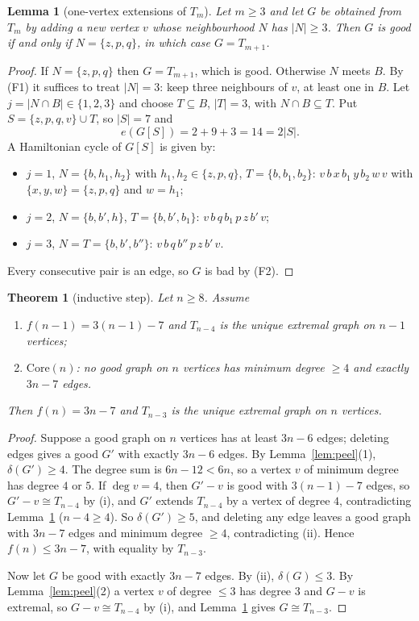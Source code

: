 \documentclass[11pt]{amsart}
\newtheorem{theorem}{Theorem}
\newtheorem{lemma}{Lemma}
\theoremstyle{remark}
\newcommand{\Tm}[1]{T_{#1}}
\begin{document}
\begin{lemma}[one-vertex extensions of $\Tm m$]\label{lem:ext}
Let $m\ge3$ and let $G$ be obtained from $\Tm m$ by adding a new vertex $v$ whose neighbourhood $N$ has $|N|\ge3$. Then $G$ is good if and only if $N=\{z,p,q\}$, in which case $G=\Tm{m+1}$.
\end{lemma}
\begin{proof}
If $N=\{z,p,q\}$ then $G=\Tm{m+1}$, which is good. Otherwise $N$ meets $B$. By (F1) it suffices to treat $|N|=3$: keep three neighbours of $v$, at least one in $B$. Let $j=|N\cap B|\in\{1,2,3\}$ and choose $T\subseteq B$, $|T|=3$, with $N\cap B\subseteq T$. Put $S=\{z,p,q,v\}\cup T$, so $|S|=7$ and
\[
e(G[S])=2+9+3=14=2|S|.
\]
A Hamiltonian cycle of $G[S]$ is given by:
\begin{itemize}
\item $j=1$, $N=\{b,h_1,h_2\}$ with $h_1,h_2\in\{z,p,q\}$, $T=\{b,b_1,b_2\}$: $v\,b\,x\,b_1\,y\,b_2\,w\,v$ with $\{x,y,w\}=\{z,p,q\}$ and $w=h_1$;
\item $j=2$, $N=\{b,b',h\}$, $T=\{b,b',b_1\}$: $v\,b\,q\,b_1\,p\,z\,b'\,v$;
\item $j=3$, $N=T=\{b,b',b''\}$: $v\,b\,q\,b''\,p\,z\,b'\,v$.
\end{itemize}
Every consecutive pair is an edge, so $G$ is bad by (F2).
\end{proof}

\begin{theorem}[inductive step]\label{thm:ind}
Let $n\ge8$. Assume
\begin{enumerate}
\item[(i)] $f(n-1)=3(n-1)-7$ and $\Tm{n-4}$ is the unique extremal graph on $n-1$ vertices;
\item[(ii)] $\mathrm{Core}(n)$: no good graph on $n$ vertices has minimum degree $\ge4$ and exactly $3n-7$ edges.
\end{enumerate}
Then $f(n)=3n-7$ and $\Tm{n-3}$ is the unique extremal graph on $n$ vertices.
\end{theorem}
\begin{proof}
Suppose a good graph on $n$ vertices has at least $3n-6$ edges; deleting edges gives a good $G'$ with exactly $3n-6$ edges. By Lemma~\ref{lem:peel}(1), $\delta(G')\ge4$. The degree sum is $6n-12<6n$, so a vertex $v$ of minimum degree has degree $4$ or $5$. If $\deg v=4$, then $G'-v$ is good with $3(n-1)-7$ edges, so $G'-v\cong\Tm{n-4}$ by (i), and $G'$ extends $\Tm{n-4}$ by a vertex of degree $4$, contradicting Lemma~\ref{lem:ext} ($n-4\ge4$). So $\delta(G')\ge5$, and deleting any edge leaves a good graph with $3n-7$ edges and minimum degree $\ge4$, contradicting (ii). Hence $f(n)\le 3n-7$, with equality by $\Tm{n-3}$.

Now let $G$ be good with exactly $3n-7$ edges. By (ii), $\delta(G)\le3$. By Lemma~\ref{lem:peel}(2) a vertex $v$ of degree $\le 3$ has degree $3$ and $G-v$ is extremal, so $G-v\cong\Tm{n-4}$ by (i), and Lemma~\ref{lem:ext} gives $G\cong\Tm{n-3}$.
\end{proof}
\end{document}
